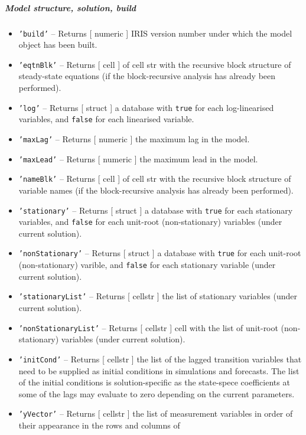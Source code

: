 \subparagraph{Model structure, solution,
build}

\begin{itemize}
\item
  \texttt{'build'} -- Returns {[} numeric {]} IRIS version number under
  which the model object has been built.
\item
  \texttt{'eqtnBlk'} -- Returns {[} cell {]} of cell str with the
  recursive block structure of steady-state equations (if the
  block-recursive analysis has already been performed).
\item
  \texttt{'log'} -- Returns {[} struct {]} a database with \texttt{true}
  for each log-linearised variables, and \texttt{false} for each
  linearised variable.
\item
  \texttt{'maxLag'} -- Returns {[} numeric {]} the maximum lag in the
  model.
\item
  \texttt{'maxLead'} -- Returns {[} numeric {]} the maximum lead in the
  model.
\item
  \texttt{'nameBlk'} -- Returns {[} cell {]} of cell str with the
  recursive block structure of variable names (if the block-recursive
  analysis has already been performed).
\item
  \texttt{'stationary'} -- Returns {[} struct {]} a database with
  \texttt{true} for each stationary variables, and \texttt{false} for
  each unit-root (non-stationary) variables (under current solution).
\item
  \texttt{'nonStationary'} -- Returns {[} struct {]} a database with
  \texttt{true} for each unit-root (non-stationary) varible, and
  \texttt{false} for each stationary variable (under current solution).
\item
  \texttt{'stationaryList'} -- Returns {[} cellstr {]} the list of
  stationary variables (under current solution).
\item
  \texttt{'nonStationaryList'} -- Returns {[} cellstr {]} cell with the
  list of unit-root (non-stationary) variables (under current solution).
\item
  \texttt{'initCond'} -- Returns {[} cellstr {]} the list of the lagged
  transition variables that need to be supplied as initial conditions in
  simulations and forecasts. The list of the initial conditions is
  solution-specific as the state-spece coefficients at some of the lags
  may evaluate to zero depending on the current parameters.
\item
  \texttt{'yVector'} -- Returns {[} cellstr {]} the list of measurement
  variables in order of their appearance in the rows and columns of

\end{itemize}
